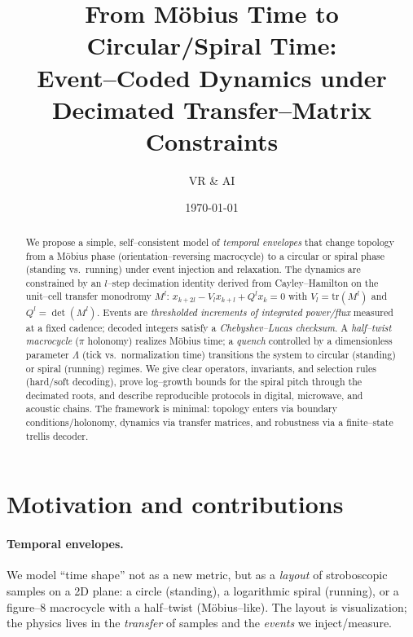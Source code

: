 \documentclass[11pt]{article}
\title{\textbf{From Möbius Time to Circular/Spiral Time:\\
Event--Coded Dynamics under Decimated Transfer--Matrix Constraints}}
\author{VR \& AI}
\date{\today}
\theoremstyle{definition}
\theoremstyle{remark}
\newcommand{\tr}{\mathrm{tr}}
\begin{document}
\maketitle

\begin{abstract}
We propose a simple, self--consistent model of \emph{temporal envelopes} that change topology from a Möbius phase
(orientation--reversing macrocycle) to a circular or spiral phase (standing vs.\ running) under event injection and relaxation.
The dynamics are constrained by an $l$--step decimation identity derived from Cayley--Hamilton on the unit--cell transfer monodromy $M^l$:
\(
x_{k+2l}-V_l x_{k+l}+Q^l x_k=0
\)
with $V_l=\tr(M^l)$ and $Q^l=\det(M^l)$.
Events are \emph{thresholded increments of integrated power/flux} measured at a fixed cadence; decoded integers satisfy a
\emph{Chebyshev--Lucas checksum}. A \emph{half--twist macrocycle} ($\pi$ holonomy) realizes Möbius time; a \emph{quench} controlled by a
dimensionless parameter $\Lambda$ (tick vs.\ normalization time) transitions the system to circular (standing) or spiral (running) regimes.
We give clear operators, invariants, and selection rules (hard/soft decoding), prove log--growth bounds for the spiral pitch through the decimated roots,
and describe reproducible protocols in digital, microwave, and acoustic chains. The framework is minimal: topology enters via boundary conditions/holonomy,
dynamics via transfer matrices, and robustness via a finite--state trellis decoder.
\end{abstract}

\tableofcontents

\section{Motivation and contributions}
\paragraph{Temporal envelopes.} We model ``time shape'' not as a new metric, but as a \emph{layout} of stroboscopic samples on a 2D plane:
a circle (standing), a logarithmic spiral (running), or a figure--8 macrocycle with a half--twist (Möbius--like). The layout is visualization;
the physics lives in the \emph{transfer} of samples and the \emph{events} we inject/measure.
\end{document}
